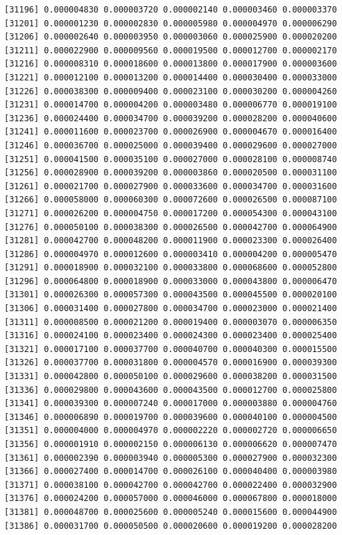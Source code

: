 \documentclass[]{article}
\begin{document}
\begin{verbatim}
[31196] 0.000004830 0.000003720 0.000002140 0.000003460 0.000003370
[31201] 0.000001230 0.000002830 0.000005980 0.000004970 0.000006290
[31206] 0.000002640 0.000003950 0.000003060 0.000025900 0.000020200
[31211] 0.000022900 0.000009560 0.000019500 0.000012700 0.000002170
[31216] 0.000008310 0.000018600 0.000013800 0.000017900 0.000003600
[31221] 0.000012100 0.000013200 0.000014400 0.000030400 0.000033000
[31226] 0.000038300 0.000009400 0.000023100 0.000030200 0.000004260
[31231] 0.000014700 0.000004200 0.000003480 0.000006770 0.000019100
[31236] 0.000024400 0.000034700 0.000039200 0.000028200 0.000040600
[31241] 0.000011600 0.000023700 0.000026900 0.000004670 0.000016400
[31246] 0.000036700 0.000025000 0.000039400 0.000029600 0.000027000
[31251] 0.000041500 0.000035100 0.000027000 0.000028100 0.000008740
[31256] 0.000028900 0.000039200 0.000003860 0.000020500 0.000031100
[31261] 0.000021700 0.000027900 0.000033600 0.000034700 0.000031600
[31266] 0.000058000 0.000060300 0.000072600 0.000026500 0.000087100
[31271] 0.000026200 0.000004750 0.000017200 0.000054300 0.000043100
[31276] 0.000050100 0.000038300 0.000026500 0.000042700 0.000064900
[31281] 0.000042700 0.000048200 0.000011900 0.000023300 0.000026400
[31286] 0.000004970 0.000012600 0.000003410 0.000004200 0.000005470
[31291] 0.000018900 0.000032100 0.000033800 0.000068600 0.000052800
[31296] 0.000064800 0.000018900 0.000033000 0.000043800 0.000006470
[31301] 0.000026300 0.000057300 0.000043500 0.000045500 0.000020100
[31306] 0.000031400 0.000027800 0.000034700 0.000023000 0.000021400
[31311] 0.000008500 0.000021200 0.000019400 0.000003070 0.000006350
[31316] 0.000024100 0.000023400 0.000024300 0.000023400 0.000025400
[31321] 0.000017100 0.000037700 0.000040700 0.000040300 0.000015500
[31326] 0.000037700 0.000031800 0.000004570 0.000016900 0.000039300
[31331] 0.000042800 0.000050100 0.000029600 0.000038200 0.000031500
[31336] 0.000029800 0.000043600 0.000043500 0.000012700 0.000025800
[31341] 0.000039300 0.000007240 0.000017000 0.000003880 0.000004760
[31346] 0.000006890 0.000019700 0.000039600 0.000040100 0.000004500
[31351] 0.000004000 0.000004970 0.000002220 0.000002720 0.000006650
[31356] 0.000001910 0.000002150 0.000006130 0.000006620 0.000007470
[31361] 0.000002390 0.000003940 0.000005300 0.000027900 0.000032300
[31366] 0.000027400 0.000014700 0.000026100 0.000040400 0.000003980
[31371] 0.000038100 0.000042700 0.000042700 0.000022400 0.000032900
[31376] 0.000024200 0.000057000 0.000046000 0.000067800 0.000018000
[31381] 0.000048700 0.000025600 0.000005240 0.000015600 0.000044900
[31386] 0.000031700 0.000050500 0.000020600 0.000019200 0.000028200

\end{verbatim}
\end{document}
